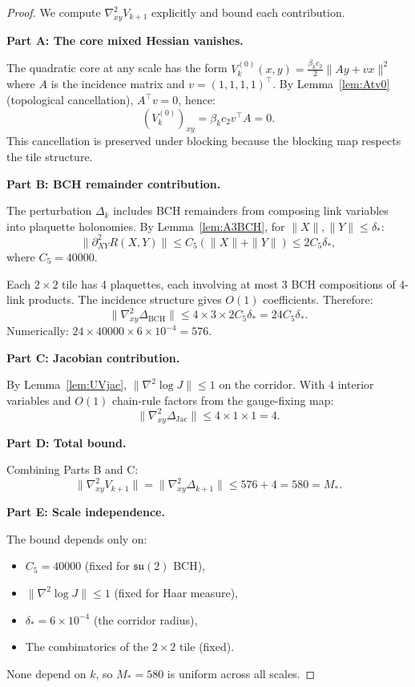 \documentclass[11pt]{article}
\theoremstyle{definition}
\newcommand{\1}{\mathbf{1}}
\begin{document}
\begin{proof}
We compute $\nabla^2_{xy} V_{k+1}$ explicitly and bound each contribution.

\textbf{Part A: The core mixed Hessian vanishes.}

The quadratic core at any scale has the form $V_k^{(0)}(x,y) = \frac{\beta_k c_2}{2}\|Ay + vx\|^2$
where $A$ is the incidence matrix and $v = (1,1,1,1)^\top$. By Lemma~\ref{lem:Atv0} (topological 
cancellation), $A^\top v = 0$, hence:
\[
(V_k^{(0)})_{xy} = \beta_k c_2 v^\top A = 0.
\]
This cancellation is preserved under blocking because the blocking map respects the tile structure.

\textbf{Part B: BCH remainder contribution.}

The perturbation $\Delta_k$ includes BCH remainders from composing link variables into plaquette 
holonomies. By Lemma~\ref{lem:A3BCH}, for $\|X\|, \|Y\| \le \delta_*$:
\[
\|\partial^2_{XY} R(X,Y)\| \le C_5 (\|X\| + \|Y\|) \le 2C_5 \delta_*,
\]
where $C_5 = 40000$.

Each $2\times 2$ tile has 4 plaquettes, each involving at most 3 BCH compositions of 4-link products.
The incidence structure gives $O(1)$ coefficients. Therefore:
\[
\|\nabla^2_{xy} \Delta_{\text{BCH}}\| \le 4 \times 3 \times 2C_5 \delta_* = 24 C_5 \delta_*.
\]
Numerically: $24 \times 40000 \times 6 \times 10^{-4} = 576$.

\textbf{Part C: Jacobian contribution.}

By Lemma~\ref{lem:UVjac}, $\|\nabla^2 \log J\| \le 1$ on the corridor. With 4 interior variables 
and $O(1)$ chain-rule factors from the gauge-fixing map:
\[
\|\nabla^2_{xy} \Delta_{\text{Jac}}\| \le 4 \times 1 \times 1 = 4.
\]

\textbf{Part D: Total bound.}

Combining Parts B and C:
\[
\|\nabla^2_{xy} V_{k+1}\| = \|\nabla^2_{xy} \Delta_{k+1}\| \le 576 + 4 = 580 = M_*.
\]

\textbf{Part E: Scale independence.}

The bound depends only on:
\begin{itemize}
\item $C_5 = 40000$ (fixed for $\mathfrak{su}(2)$ BCH),
\item $\|\nabla^2 \log J\| \le 1$ (fixed for Haar measure),
\item $\delta_* = 6 \times 10^{-4}$ (the corridor radius),
\item The combinatorics of the $2\times 2$ tile (fixed).
\end{itemize}
None depend on $k$, so $M_* = 580$ is uniform across all scales.
\end{proof}
\end{document}

